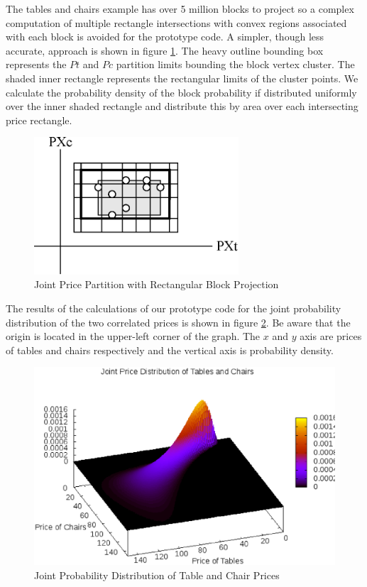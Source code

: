 The tables and chairs example has over 5 million blocks to project so a complex computation of multiple rectangle intersections with convex regions associated with each block is avoided for the prototype code. A simpler, though less accurate, approach is shown in figure \ref{fig:ptc_rectange_rectangle}. The heavy outline bounding box represents the $Pt$ and $Pc$ partition limits bounding the block vertex cluster. The shaded inner rectangle represents the rectangular limits of the cluster points. We calculate the probability density of the block probability if distributed uniformly over the inner shaded rectangle and distribute this by area over each intersecting price rectangle. 

\begin{figure}
  \centering
  \includegraphics[width=3in]{Images/ptc_rectangle_rectangle}
  \caption[Joint Price Partition with Rectangular Block Projection]
          {Joint Price Partition with Rectangular Block Projection}
  \label{fig:ptc_rectange_rectangle}
\end{figure}

The results of the calculations of our prototype code for the joint probability distribution of the two correlated prices is shown in figure \ref{fig:Ptc}. Be aware that the origin is located in the upper-left corner of the graph. The $x$ and $y$ axis are prices of tables and chairs respectively and the vertical axis is probability density.
\begin{figure}
  \centering
  \includegraphics[width=120mm]{Images/Ptc.eps}
  \caption[Joint Probability Distribution of Table and Chair Prices]
          {Joint Probability Distribution of Table and Chair Prices}
  \label{fig:Ptc}
\end{figure}

